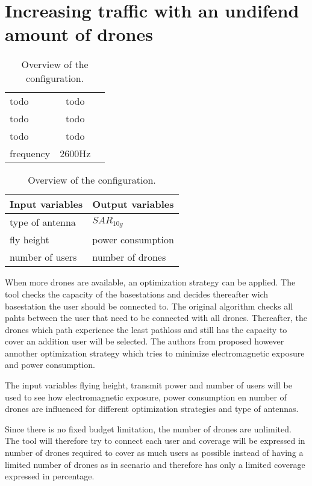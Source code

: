 

\section{Increasing traffic with an undifend amount of drones}

\begin{table}[!htb]
    \begin{minipage}{.5\linewidth}
      \centering
        \begin{tabular}{|l|c|l|}
        \hline
        todo               & todo        \\    
        todo               & todo\\ 
        todo               & todo                     \\ 
        frequency                      & 2600Hz                   \\ 
        \hline
        \end{tabular}
    \end{minipage}%
    \begin{minipage}{.5\linewidth}
      \centering
            \begin{tabular}{|l|l|}
            \hline
            Input variables                & Output variables          \\   \hline 
            type of antenna                & $SAR_{10g}$               \\ 
            fly height                     & power consumption             \\ 
            number of users                & number of drones            \\ 
            \hline
            \end{tabular}
    \end{minipage} 
        \caption{Overview of the configuration.}
        \label{table:confOverviewScenario2}
\end{table}


When more drones are available, an optimization strategy can be applied. The tool checks the capacity of the basestations and decides thereafter
wich basestation the user should be connected to. The original algorithm checks all pahts between the user that need to be connected with 
all drones. Thereafter, the drones which path experience the least pathloss and still has the capacity to cover an addition user will be selected.
The authors from \cite{J1} proposed however annother optimization strategy which tries to minimize electromagnetic exposure and 
power consumption.

The input variables flying height, transmit power and number of users will be used to see how electromagnetic exposure, power consumption en number of drones are influenced for
different optimization strategies and type of antennas.

Since there is no fixed budget limitation, the number of drones are unlimited. The tool will therefore try to connect each user and
coverage will be expressed in number of drones required to cover as much users as possible instead of having a limited number of drones  
as in scenario and therefore has only a limited coverage expressed in percentage.